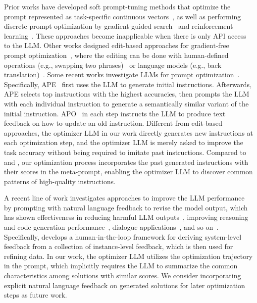  Prior works have developed soft prompt-tuning methods that optimize the prompt represented as task-specific continuous vectors~\citep{lester2021power,li2021prefix,liu2021gpt,qin2021learning}, as well as performing discrete prompt optimization by gradient-guided search~\citep{shin2020autoprompt,wen2023hard,gao2020making,chen2023instructzero} and reinforcement learning~\citep{deng2022rlprompt,zhang2022tempera}. 
These approaches become inapplicable when there is only API access to the LLM. 
Other works designed edit-based approaches for gradient-free prompt optimization~\citep{xu2022gps,prasad2022grips}, where the editing can be done with human-defined operations (e.g., swapping two phrases)~\citep{prasad2022grips} or language models (e.g., back translation)~\citep{xu2022gps}. 
Some recent works investigate LLMs for prompt optimization~\citep{zhou2022large,pryzant2023automatic,xu2023wizardlm}. 
Specifically, APE~\citep{zhou2022large} first uses the LLM to generate initial instructions. Afterwards, APE selects top instructions with the highest accuracies, then prompts the LLM with each individual instruction to generate a semantically similar variant of the initial instruction.
APO~\citep{pryzant2023automatic} in each step instructs the LLM to produce text feedback on how to update an old instruction. 
Different from edit-based approaches, the optimizer LLM in our work directly generates new instructions at each optimization step, and the optimizer LLM is merely asked to improve the task accuracy without being required to imitate past instructions. Compared to \citet{zhou2022large} and \citet{pryzant2023automatic}, our optimization process incorporates the past generated instructions with their scores in the meta-prompt, enabling the optimizer LLM to discover common patterns of high-quality instructions.

 A recent line of work investigates approaches to improve the LLM performance by prompting with natural language feedback to revise the model output, which has shown effectiveness in reducing harmful LLM outputs~\citep{bai2022constitutional,ganguli2023capacity}, improving reasoning~\citep{shinn2023reflexion,madaan2023self} and code generation performance~\citep{chen2023teaching,olausson2023demystifying,shinn2023reflexion,chen2023improving}, dialogue applications~\citep{nair2023dera,madaan2023self,yuan2023system}, and so on~\citep{kim2023language,wang2023voyager}. Specifically, \citet{yuan2023system} develops a human-in-the-loop framework for deriving system-level feedback from a collection of instance-level feedback, which is then used for refining data. In our work, the optimizer LLM utilizes the optimization trajectory in the prompt, which implicitly requires the LLM to summarize the common characteristics among solutions with similar scores. We consider incorporating explicit natural language feedback on generated solutions for later optimization steps as future work.

